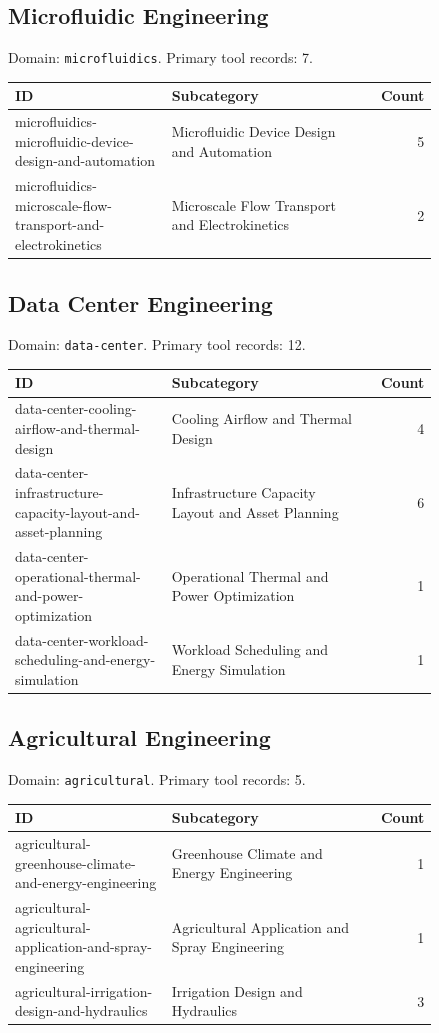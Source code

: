 \subsection{Microfluidic Engineering}
\noindent Domain: \texttt{microfluidics}. Primary tool records: 7.
\begin{longtable}{p{0.37\linewidth}p{0.47\linewidth}r}
ID & Subcategory & Count\\\hline\endhead
microfluidics-microfluidic-device-design-and-automation & Microfluidic Device Design and Automation & 5\\
microfluidics-microscale-flow-transport-and-electrokinetics & Microscale Flow Transport and Electrokinetics & 2\\
\end{longtable}
\subsection{Data Center Engineering}
\noindent Domain: \texttt{data-center}. Primary tool records: 12.
\begin{longtable}{p{0.37\linewidth}p{0.47\linewidth}r}
ID & Subcategory & Count\\\hline\endhead
data-center-cooling-airflow-and-thermal-design & Cooling Airflow and Thermal Design & 4\\
data-center-infrastructure-capacity-layout-and-asset-planning & Infrastructure Capacity Layout and Asset Planning & 6\\
data-center-operational-thermal-and-power-optimization & Operational Thermal and Power Optimization & 1\\
data-center-workload-scheduling-and-energy-simulation & Workload Scheduling and Energy Simulation & 1\\
\end{longtable}
\subsection{Agricultural Engineering}
\noindent Domain: \texttt{agricultural}. Primary tool records: 5.
\begin{longtable}{p{0.37\linewidth}p{0.47\linewidth}r}
ID & Subcategory & Count\\\hline\endhead
agricultural-greenhouse-climate-and-energy-engineering & Greenhouse Climate and Energy Engineering & 1\\
agricultural-agricultural-application-and-spray-engineering & Agricultural Application and Spray Engineering & 1\\
agricultural-irrigation-design-and-hydraulics & Irrigation Design and Hydraulics & 3\\
\end{longtable}

